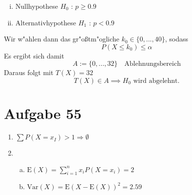 \documentclass[10pt, oneside]{article}
\begin{document}
\begin{enumerate}[(a)]
\begin{enumerate}[i)]
            \item Nullhypothese $H_0$ : $p \geq 0.9$
            \item Alternativhypothese $H_1$ : $p < 0.9$
        \end{enumerate}
        Wir w"ahlen dann das gr"o{\ss}tm"ogliche $k_0 \in \{0,...,40\}$,
        sodass
        \begin{equation*}
            P(X \leq k_0) \leq \alpha
        \end{equation*}
        Es ergibt sich damit
        \begin{equation*}
            A := \{0,...,32\} \quad \text{Ablehnungsbereich}
        \end{equation*}
        Daraus folgt mit $T(X) = 32$
        \begin{equation*}
            T(X) \in A \implies H_0 \text{ wird abgelehnt.}
        \end{equation*}
\end{enumerate}

\section{Aufgabe 55}

\begin{enumerate}
    \item $\sum P(X = x_I) > 1 \Rightarrow \emptyset$

    \item
        \begin{enumerate}[(a)]
            \item $\text{E}(X) = \sum_{i = 1}^n x_iP(X = x_i) = 2$
            \item $\text{Var}(X) = \text{E}(X - \text{E}(X))^2 = 2.59$
        \end{enumerate}
\end{enumerate}
\end{document}
